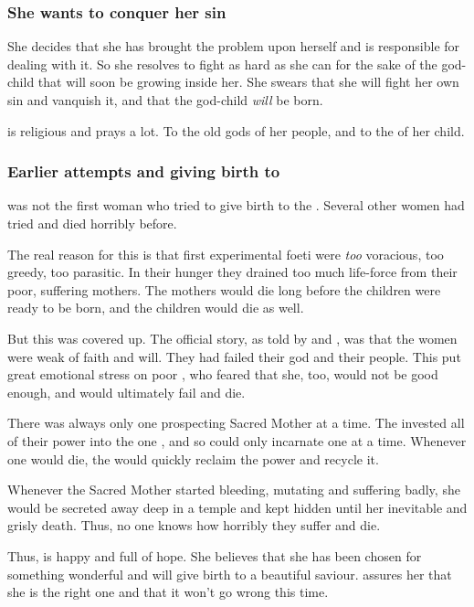 \subsubsection{She wants to conquer her sin}
She decides that she has brought the problem upon herself and is responsible for dealing with it. So she resolves to fight as hard as she can for the sake of the god-child that will soon be growing inside her. She swears that she will fight her own sin and vanquish it, and that the god-child \emph{will} be born. 

\Ilu{} is religious and prays a lot. To the old gods of her people, and to \dash the  of her child.





\subsubsection{Earlier attempts and giving birth to \resphain}
\Ilu{} was not the first woman who tried to give birth to the \banemessiah. Several other women had tried and died horribly before. 

The real reason for this is that first experimental \resphan{} foeti were \emph{too} voracious, too greedy, too parasitic. In their hunger they drained too much life-force from their poor, suffering mothers. The mothers would die long before the children were ready to be born, and the children would die as well.

But this was covered up. The official story, as told by \Semiza{} and \Eshayzal, was that the women were weak of faith and will. They had failed their god and their people. This put great emotional stress on poor \Ilu, who feared that she, too, would not be good enough, and would ultimately fail and die. 

There was always only one prospecting Sacred Mother at a time. The \banelords{} invested all of their \resphan{} power into the one \banemessiah, and so could only incarnate one at a time. Whenever one would die, the \banes{} would quickly reclaim the power and recycle it. 

Whenever the Sacred Mother started bleeding, mutating and suffering badly, she would be secreted away deep in a temple and kept hidden until her inevitable and grisly death. Thus, no one knows how horribly they suffer and die. 

Thus, \Ilu{} is happy and full of hope. She believes that she has been chosen for something wonderful and will give birth to a beautiful saviour. \Semiza{} assures her that she is the right one and that it won't go wrong this time. 

